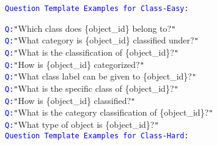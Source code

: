 \begin{figure*}[htbp]
\centering
\begin{tcolorbox}[colback=gray!10,%
	colframe=black,%
	width=\textwidth,
	arc=1mm, auto outer arc,
	boxrule=0.5pt,
	]

 	\texttt{\textcolor{blue}{Question Template Examples for Class-Easy:}}
  
        \texttt{\textcolor{blue}{Q:}}\texttt{"}Which class does \mbox{\{object\_id\}} belong to?\texttt{"}\\
        \texttt{\textcolor{blue}{Q:}}\texttt{"}What category is \mbox{\{object\_id\}} classified under?\texttt{"}\\
        \texttt{\textcolor{blue}{Q:}}\texttt{"}What is the classification of \mbox{\{object\_id\}}?\texttt{"}\\
        \texttt{\textcolor{blue}{Q:}}\texttt{"}How is \mbox{\{object\_id\}} categorized?\texttt{"}\\
        \texttt{\textcolor{blue}{Q:}}\texttt{"}What class label can be given to \mbox{\{object\_id\}}?\texttt{"}\\
        \texttt{\textcolor{blue}{Q:}}\texttt{"}What is the specific class of \mbox{\{object\_id\}}?\texttt{"}\\
        \texttt{\textcolor{blue}{Q:}}\texttt{"}How is \mbox{\{object\_id\}} classified?\texttt{"}\\
        \texttt{\textcolor{blue}{Q:}}\texttt{"}What is the category classification of \mbox{\{object\_id\}}?\texttt{"}\\
        \texttt{\textcolor{blue}{Q:}}\texttt{"}What type of object is \mbox{\{object\_id\}}?\texttt{"}\\

  	\texttt{\textcolor{blue}{Question Template Examples for Class-Hard:}}
	

\end{tcolorbox}
\end{figure*}
